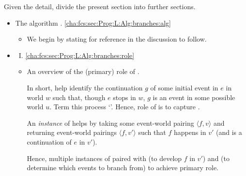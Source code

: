 \begin{note}[Division]
  Given the detail, divide the present section into further sections.

  \begin{itemize}[noitemsep]
  \item
    The algorithm \AlgFindBranches{}.%
    \hfill\autoref{cha:fcs:sec:Prog:L:Alg:branches:alg}
    \begin{itemize}
    \item
      We begin by stating \AlgFindBranches{} for reference in the discussion to follow.
    \end{itemize}
  \item
    ~I.%
    \hfill\autoref{cha:fcs:sec:Prog:L:Alg:branches:role}
    \begin{itemize}
    \item
      An overview of the (primary) role of \AlgFindBranches{}.

      In short, help identify the continuation \(g\) of some initial event in \(e\) in world \(w\) such that, though \(e\) stops in \(w\), \(g\) is an event in some possible world \(u\).
      Term this process `\drift{}'.
      Hence, role of \AlgFindBranches{} is to capture .

      An \emph{instance} of \AlgFindBranches{} helps by taking some event-world pairing \(\langle f,v \rangle\) and returning event-world pairings \(\langle f,v' \rangle\) such that \(f\) happens in \(v'\) (and is a continuation of \(e\) in \(v'\)).

      Hence, multiple instances of \AlgFindBranches{} paired with \AlgAC{} (to develop \(f\) in \(v'\)) and \AlgGetStops{} (to determine which events to branch from) to achieve primary role.


\end{itemize}
\end{itemize}
\end{note}
